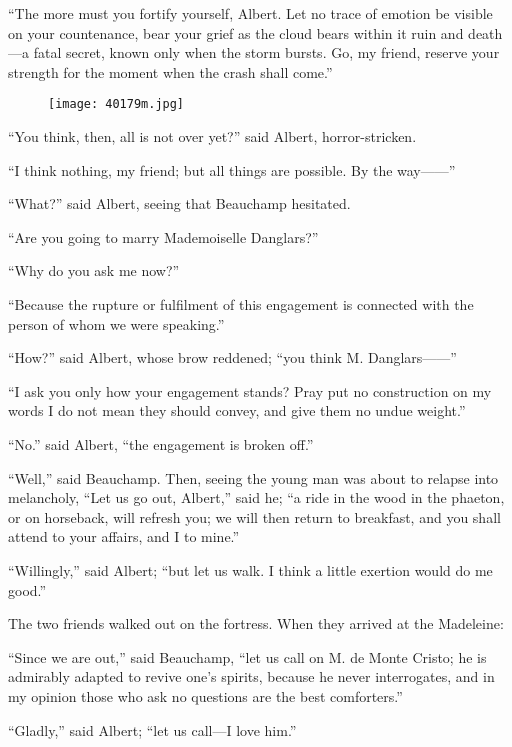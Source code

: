 “The more must you fortify yourself, Albert. Let no trace of emotion be
visible on your countenance, bear your grief as the cloud bears within
it ruin and death—a fatal secret, known only when the storm bursts. Go,
my friend, reserve your strength for the moment when the crash shall
come.”

\begin{figure}[ht]
\texttt{[image: 40179m.jpg]}
\end{figure}

“You think, then, all is not over yet?” said Albert, horror-stricken.

“I think nothing, my friend; but all things are possible. By the way——”

“What?” said Albert, seeing that Beauchamp hesitated.

“Are you going to marry Mademoiselle Danglars?”

“Why do you ask me now?”

“Because the rupture or fulfilment of this engagement is connected with
the person of whom we were speaking.”

“How?” said Albert, whose brow reddened; “you think M. Danglars——”

“I ask you only how your engagement stands? Pray put no construction on
my words I do not mean they should convey, and give them no undue
weight.”

“No.” said Albert, “the engagement is broken off.”

“Well,” said Beauchamp. Then, seeing the young man was about to relapse
into melancholy, “Let us go out, Albert,” said he; “a ride in the wood
in the phaeton, or on horseback, will refresh you; we will then return
to breakfast, and you shall attend to your affairs, and I to mine.”

“Willingly,” said Albert; “but let us walk. I think a little exertion
would do me good.”

The two friends walked out on the fortress. When they arrived at the
Madeleine:

“Since we are out,” said Beauchamp, “let us call on M. de Monte Cristo;
he is admirably adapted to revive one’s spirits, because he never
interrogates, and in my opinion those who ask no questions are the best
comforters.”

“Gladly,” said Albert; “let us call—I love him.”
